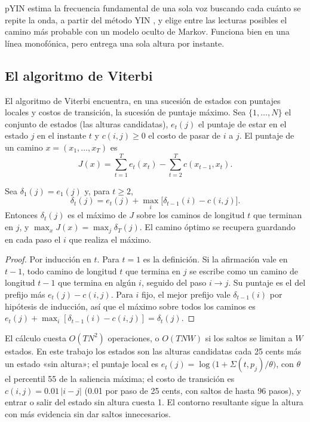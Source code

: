 pYIN \citep{mauch2014} estima la frecuencia fundamental de una sola voz buscando cada cuánto se repite la onda, a partir
del método YIN \citep{decheveigne2002}, y elige entre las lecturas posibles el camino más probable con un modelo oculto
de Markov. Funciona bien en una línea monofónica, pero entrega una sola altura por instante.

\subsection{El algoritmo de Viterbi}

El algoritmo de Viterbi \citep{viterbi1967} encuentra, en una sucesión de estados con puntajes locales y costos de
transición, la sucesión de puntaje máximo. Sea $\{1, \dots, N\}$ el conjunto de estados (las alturas candidatas), $e_t(j)$
el puntaje de estar en el estado $j$ en el instante $t$ y $c(i, j) \ge 0$ el costo de pasar de $i$ a $j$. El puntaje de un
camino $x = (x_1, \dots, x_T)$ es
\[
  J(x) = \sum_{t=1}^{T} e_t(x_t) - \sum_{t=2}^{T} c(x_{t-1}, x_t).
\]

\begin{proposicion}\label{prop:viterbi}
Sea $\delta_1(j) = e_1(j)$ y, para $t \ge 2$,
\[
  \delta_t(j) = e_t(j) + \max_{i} \bigl[\delta_{t-1}(i) - c(i, j)\bigr].
\]
Entonces $\delta_t(j)$ es el máximo de $J$ sobre los caminos de longitud $t$ que terminan en $j$, y
$\max_x J(x) = \max_j \delta_T(j)$. El camino óptimo se recupera guardando en cada paso el $i$ que realiza el máximo.
\end{proposicion}

\begin{proof}
Por inducción en $t$. Para $t = 1$ es la definición. Si la afirmación vale en $t - 1$, todo camino de longitud $t$ que
termina en $j$ se escribe como un camino de longitud $t - 1$ que termina en algún $i$, seguido del paso $i \to j$. Su
puntaje es el del prefijo más $e_t(j) - c(i, j)$. Para $i$ fijo, el mejor prefijo vale $\delta_{t-1}(i)$ por hipótesis de
inducción, así que el máximo sobre todos los caminos es $e_t(j) + \max_i [\delta_{t-1}(i) - c(i,j)] = \delta_t(j)$.
\end{proof}

El cálculo cuesta $O(T N^2)$ operaciones, o $O(T N W)$ si los saltos se limitan a $W$ estados. En este trabajo los
estados son las alturas candidatas cada 25 cents más un estado «sin altura»; el puntaje local es
$e_t(j) = \log\bigl(1 + \Sigma(t, p_j)/\theta\bigr)$, con $\theta$ el percentil 55 de la saliencia máxima; el costo de
transición es $c(i, j) = 0.01\, |i - j|$ (0.01 por paso de 25 cents, con saltos de hasta 96 pasos), y entrar o salir del
estado sin altura cuesta 1. El contorno resultante sigue la altura con más evidencia sin dar saltos innecesarios.

